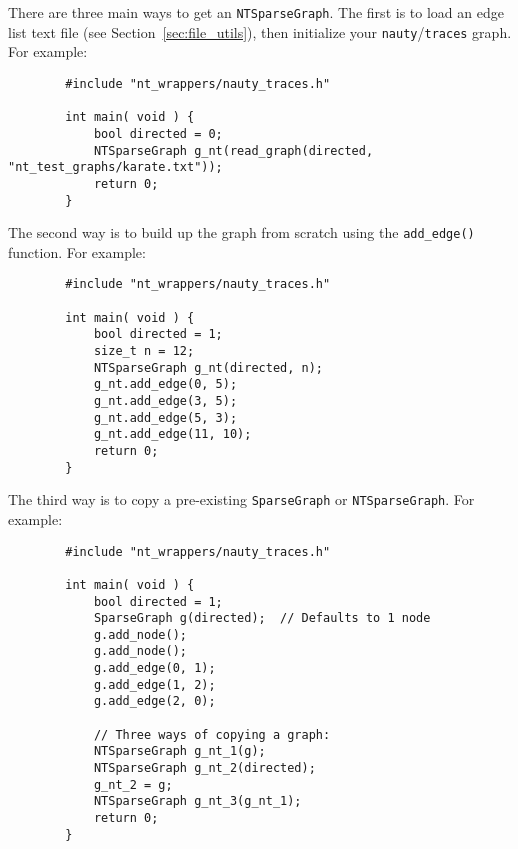 \documentclass{article}
\begin{document}
There are three main ways to get an \verb|NTSparseGraph|. The first is to load an edge list text file (see Section~\ref{sec:file_utils}), then initialize your \verb|nauty|/\verb|traces| graph. For example:

\begin{verbatim}
        #include "nt_wrappers/nauty_traces.h"
        
        int main( void ) {
            bool directed = 0;
            NTSparseGraph g_nt(read_graph(directed, "nt_test_graphs/karate.txt"));
            return 0;
        }
\end{verbatim}

The second way is to build up the graph from scratch using the \verb|add_edge()| function. For example:

\vspace{-0.2cm}

\begin{verbatim}
        #include "nt_wrappers/nauty_traces.h"
        
        int main( void ) {
            bool directed = 1;
            size_t n = 12;
            NTSparseGraph g_nt(directed, n);
            g_nt.add_edge(0, 5);
            g_nt.add_edge(3, 5);
            g_nt.add_edge(5, 3);
            g_nt.add_edge(11, 10);
            return 0;
        }
\end{verbatim}

The third way is to copy a pre-existing \verb|SparseGraph| or \verb|NTSparseGraph|. For example:

\vspace{-0.2cm}

\begin{verbatim}
        #include "nt_wrappers/nauty_traces.h"
        
        int main( void ) {
            bool directed = 1;
            SparseGraph g(directed);  // Defaults to 1 node
            g.add_node();
            g.add_node();
            g.add_edge(0, 1);
            g.add_edge(1, 2);
            g.add_edge(2, 0);

            // Three ways of copying a graph:
            NTSparseGraph g_nt_1(g);
            NTSparseGraph g_nt_2(directed);
            g_nt_2 = g;
            NTSparseGraph g_nt_3(g_nt_1);
            return 0;
        }
\end{verbatim}

\ 

\vspace{-1cm}
\end{document}
